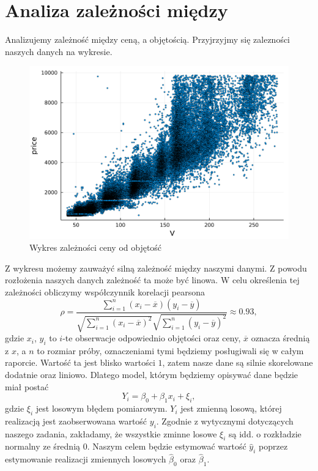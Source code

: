 \documentclass[12pt,leqno]{article}
\theoremstyle{exer}
\begin{document}
	\section{Analiza zależności między }
	Analizujemy zależność między ceną, a objętością. Przyjrzyjmy się zalezności naszych danych na wykresie.
	\begin{figure}[H]\label{fig:v_vs_price}\centering
		\includegraphics[width=4\columnwidth/5]{images/Budnik/v_vs_price.png}\caption{Wykres zależności ceny od objętość}
	\end{figure}
	Z wykresu możemy zauważyć silną zależność między naszymi danymi. Z powodu rozłożenia naszych danych zależność ta może być linowa. W celu określenia tej zależności obliczymy współczynnik korelacji pearsona
	\begin{equation}
		\rho=\frac{\sum_{i=1}^n\left(x_i-\overline{x}\right)\left(y_i-\overline{y}\right)}
		{\sqrt{\sum_{i=1}^n\left(x_i-\overline{x}\right)^2}\sqrt{\sum_{i=1}^n\left(y_i-\overline{y}\right)^2}}\approx0.93,
	\end{equation}
	gdzie $x_i$, $y_i$ to $i$-te obserwacje odpowiednio objętości oraz ceny, $\overline{x}$ oznacza średnią z $x$, a $n$ to rozmiar próby, oznaczeniami tymi będziemy posługiwali się w całym raporcie. Wartość ta jest blisko wartości $1$, zatem nasze dane są silnie skorelowane dodatnie oraz liniowo. Dlatego model, którym będziemy opisywać dane będzie miał postać
	\begin{equation}\label{eq:reg}
		Y_i=\beta_0+\beta_1x_i+\xi_i,
	\end{equation}
	gdzie $\xi_i$ jest losowym błędem pomiarowym. $Y_i$ jest zmienną losową, której realizacją jest zaobserwowana wartość $y_i$. Zgodnie z wytycznymi dotyczących naszego zadania, zakładamy, że wszystkie zminne losowe $\xi_i$ są idd. o rozkładzie normalny ze średnią 0. Naszym celem będzie estymować wartość $\hat y_i$ poprzez estymowanie realizacji zmiennych losowych $\hat \beta_0$ oraz $\hat\beta_1$.
\end{document}
